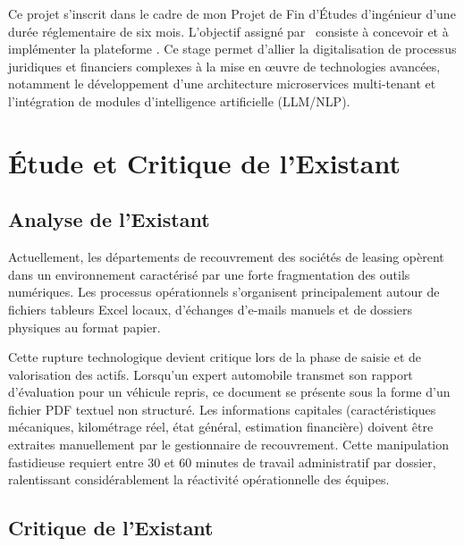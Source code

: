 Ce projet s'inscrit dans le cadre de mon Projet de Fin d'Études d'ingénieur d'une durée réglementaire de six mois. L'objectif assigné par \hostCompany\ consiste à concevoir et à implémenter la plateforme \projectShortTitle. Ce stage permet d'allier la digitalisation de processus juridiques et financiers complexes à la mise en œuvre de technologies avancées, notamment le développement d'une architecture microservices multi-tenant et l'intégration de modules d'intelligence artificielle (LLM/NLP).

\section{Étude et Critique de l'Existant}

\subsection{Analyse de l'Existant}

Actuellement, les départements de recouvrement des sociétés de leasing opèrent dans un environnement caractérisé par une forte fragmentation des outils numériques. Les processus opérationnels s'organisent principalement autour de fichiers tableurs Excel locaux, d'échanges d'e-mails manuels et de dossiers physiques au format papier.

Cette rupture technologique devient critique lors de la phase de saisie et de valorisation des actifs. Lorsqu'un expert automobile transmet son rapport d'évaluation pour un véhicule repris, ce document se présente sous la forme d'un fichier PDF textuel non structuré. Les informations capitales (caractéristiques mécaniques, kilométrage réel, état général, estimation financière) doivent être extraites manuellement par le gestionnaire de recouvrement. Cette manipulation fastidieuse requiert entre 30 et 60 minutes de travail administratif par dossier, ralentissant considérablement la réactivité opérationnelle des équipes.

\subsection{Critique de l'Existant}

